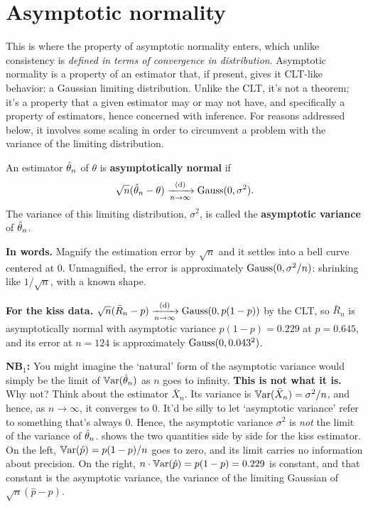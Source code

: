 \section{Asymptotic normality}
\label{sec:est-asymptotic-normality}

This is where the property of asymptotic normality enters, which unlike consistency is \textit{defined in terms of convergence in distribution}.
Asymptotic normality is a property of an estimator that, if present, gives it CLT-like behavior: a Gaussian limiting distribution.
Unlike the CLT, it's not a theorem; it's a property that a given estimator may or may not have, and specifically a property of estimators, hence concerned with inference.
For reasons addressed below, it involves some scaling in order to circumvent a problem with the variance of the limiting distribution.

\begin{definition}
\label{def:asymp-normal}
An estimator $\hat{\theta}_n$ of $\theta$ is \textbf{asymptotically normal} if
\[
\sqrt{n}(\hat{\theta}_n - \theta) \xrightarrow [n \to \infty ]{\text{(d)}} \text{Gauss}(0, \sigma^2).
\]
The variance of this limiting distribution, $\sigma^2$, is called the \textbf{asymptotic variance} of $\hat{\theta}_n$.
\end{definition}

\begin{inwords}
\textbf{In words.} Magnify the estimation error by $\sqrt{n}$ and it settles into a bell curve centered at $0$. Unmagnified, the error is approximately $\text{Gauss}(0, \sigma^2/n)$: shrinking like $1/\sqrt{n}$, with a known shape.
\par\smallskip
\textbf{For the kiss data.} $\sqrt{n}(\bar{R}_n - p) \xrightarrow [n \to \infty ]{\text{(d)}} \text{Gauss}(0, p(1-p))$ by the CLT, so $\bar{R}_n$ is asymptotically normal with asymptotic variance $p(1-p) = 0.229$ at $p = 0.645$, and its error at $n = 124$ is approximately $\text{Gauss}(0, 0.043^2)$.
\end{inwords}

\textbf{NB$_1$:} You might imagine the `natural' form of the asymptotic variance would simply be the limit of $\operatorname*{\mathbb{V}\text{ar}}(\hat{\theta}_n)$ as $n$ goes to infinity.
\textbf{This is not what it is.}
Why not?
Think about the estimator $\bar{X}_n$.
Its variance is $\operatorname*{\mathbb{V}\text{ar}}(\bar{X}_n) = \sigma^2/n$, and hence, as $n \to \infty$, it converges to 0.
It'd be silly to let `asymptotic variance' refer to something that's always 0.
Hence, the asymptotic variance $\sigma^2$ is \textit{not} the limit of the variance of $\hat{\theta}_n$.
 shows the two quantities side by side for the kiss estimator.
On the left, $\operatorname*{\mathbb{V}\text{ar}}(\hat{p}) = p(1-p)/n$ goes to zero, and its limit carries no information about precision.
On the right, $n \cdot \operatorname*{\mathbb{V}\text{ar}}(\hat{p}) = p(1-p) = 0.229$ is constant, and that constant is the asymptotic variance, the variance of the limiting Gaussian of $\sqrt{n}(\hat{p} - p)$.

